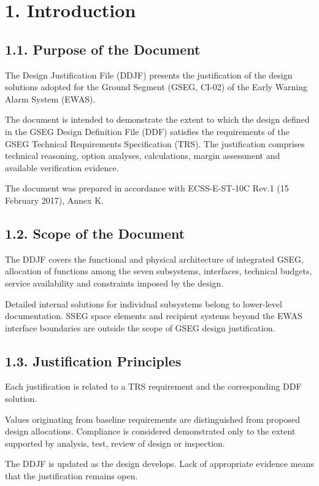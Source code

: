 \section{1. Introduction}\label{ddjf-1}

\subsection{1.1. Purpose of the Document}\label{ddjf-1-1}

The Design Justification File (DDJF) presents the justification of the design solutions adopted for the Ground Segment (GSEG, CI-02) of the Early Warning Alarm System (EWAS).

The document is intended to demonstrate the extent to which the design defined in the GSEG Design Definition File (DDF) satisfies the requirements of the GSEG Technical Requirements Specification (TRS). The justification comprises technical reasoning, option analyses, calculations, margin assessment and available verification evidence.

The document was prepared in accordance with ECSS-E-ST-10C Rev.1 (15 February 2017), Annex K.

\subsection{1.2. Scope of the Document}\label{ddjf-1-2}

The DDJF covers the functional and physical architecture of integrated GSEG, allocation of functions among the seven subsystems, interfaces, technical budgets, service availability and constraints imposed by the design.

Detailed internal solutions for individual subsystems belong to lower-level documentation. SSEG space elements and recipient systems beyond the EWAS interface boundaries are outside the scope of GSEG design justification.

\subsection{1.3. Justification Principles}\label{ddjf-1-3}

Each justification is related to a TRS requirement and the corresponding DDF solution.

Values originating from baseline requirements are distinguished from proposed design allocations. Compliance is considered demonstrated only to the extent supported by analysis, test, review of design or inspection.

The DDJF is updated as the design develops. Lack of appropriate evidence means that the justification remains open.
